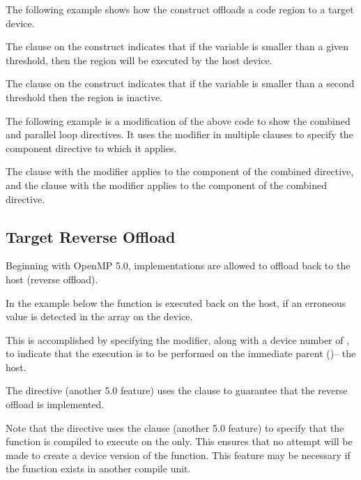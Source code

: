 The following example shows how the  construct offloads a code region 
to a target device.

The  clause on the  construct indicates that if the variable 
 is smaller than a given threshold, then the  region will be executed 
by the host device.

The  clause on the  construct indicates that if the 
variable  is smaller than a second threshold then the  region 
is inactive.



The following example is a modification of the above  code to show the combined 
and parallel loop directives. It uses the  modifier in multiple 
clauses to specify the component directive to which it applies. 

The  clause with the  modifier applies to the  component of the 
combined directive, and the  clause with the  modifier applies 
to the  component of the combined directive.    



\subsection{Target Reverse Offload}
\label{subsec:target_reverse_offload}

Beginning with OpenMP 5.0, implementations are allowed to
offload back to the host (reverse offload).

In the example below the  function
is executed back on the host, if an erroneous value is
detected in the  array on the device.

This is accomplished by specifying the 
 modifier, along with a device number of ,
to indicate that the execution is to be performed on the
immediate parent ()-- the host.

The  directive (another 5.0 feature)
uses the  clause to guarantee
that the reverse offload is implemented.

Note that the  directive uses the
 clause (another 5.0 feature) to specify that
the  function is compiled to
execute on the  only. This ensures that no
attempt will be made to create a device version of the
function.  This feature may be necessary if the function
exists in another compile unit.



